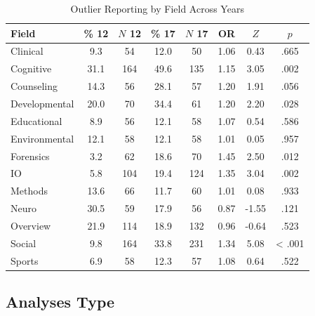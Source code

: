 \documentclass[english,man]{apa6}
\theoremstyle{definition}
\theoremstyle{definition}
\theoremstyle{definition}
\theoremstyle{remark}
\begin{document}
\begin{table}[tbp]
\begin{center}
\begin{threeparttable}
\caption{\label{tab:info-table}Outlier Reporting by Field Across Years}
\begin{tabular}{lccccccc}
\toprule
Field & \% 12 & $N$ 12 & \% 17 & $N$ 17 & OR & $Z$ & $p$\\
\midrule
Clinical & 9.3 & 54 & 12.0 & 50 & 1.06 & 0.43 & .665\\
Cognitive & 31.1 & 164 & 49.6 & 135 & 1.15 & 3.05 & .002\\
Counseling & 14.3 & 56 & 28.1 & 57 & 1.20 & 1.91 & .056\\
Developmental & 20.0 & 70 & 34.4 & 61 & 1.20 & 2.20 & .028\\
Educational & 8.9 & 56 & 12.1 & 58 & 1.07 & 0.54 & .586\\
Environmental & 12.1 & 58 & 12.1 & 58 & 1.01 & 0.05 & .957\\
Forensics & 3.2 & 62 & 18.6 & 70 & 1.45 & 2.50 & .012\\
IO & 5.8 & 104 & 19.4 & 124 & 1.35 & 3.04 & .002\\
Methods & 13.6 & 66 & 11.7 & 60 & 1.01 & 0.08 & .933\\
Neuro & 30.5 & 59 & 17.9 & 56 & 0.87 & -1.55 & .121\\
Overview & 21.9 & 114 & 18.9 & 132 & 0.96 & -0.64 & .523\\
Social & 9.8 & 164 & 33.8 & 231 & 1.34 & 5.08 & < .001\\
Sports & 6.9 & 58 & 12.3 & 57 & 1.08 & 0.64 & .522\\
\bottomrule
\end{tabular}
\end{threeparttable}
\end{center}
\end{table}

\subsection{Analyses Type}\label{analyses-type}
\end{document}
